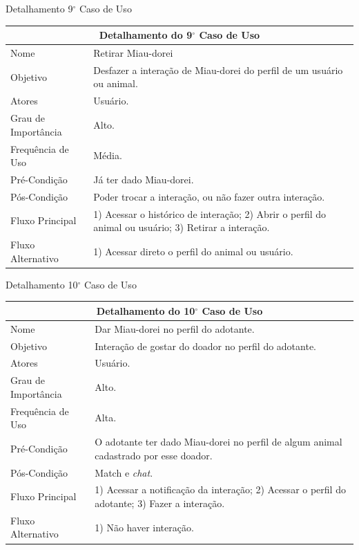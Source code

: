 \begin{apendicesenv}
\begin{quadro}[!htbp]
\caption[Detalhamento 9$^\circ$ Caso de Uso]{Detalhamento 9$^\circ$ Caso de Uso}
\begin{tabular}{|p{4cm}|p{9.95cm}|}
\hline
\multicolumn{2}{|c|}{Detalhamento do 9$^\circ$ Caso de Uso}\\ 
\hline
Nome & Retirar \gls{Miau-dorei} \\
\hline
Objetivo & Desfazer a interação de \gls{Miau-dorei} do perfil de um usuário ou animal. \\
\hline
Atores & Usuário. \\
\hline
Grau de Importância & Alto. \\
\hline
Frequência de Uso & Média. \\
\hline
Pré-Condição & Já ter dado \gls{Miau-dorei}. \\
\hline
Pós-Condição & Poder trocar a interação, ou não fazer outra interação. \\
\hline
Fluxo Principal & 1) Acessar o histórico de interação; 2) Abrir o perfil do animal ou usuário; 3) Retirar a interação. \\
\hline
Fluxo Alternativo & 1) Acessar direto o perfil do animal ou usuário. \\
\hline
\end{tabular}
\end{quadro}

\begin{quadro}[!htbp]
\caption[Detalhamento 10$^\circ$ Caso de Uso]{Detalhamento 10$^\circ$ Caso de Uso}
\begin{tabular}{|p{4cm}|p{9.95cm}|}
\hline
\multicolumn{2}{|c|}{Detalhamento do 10$^\circ$ Caso de Uso}\\ 
\hline
Nome & Dar \gls{Miau-dorei} no perfil do adotante. \\
\hline
Objetivo & Interação de gostar do doador no perfil do adotante.\\
\hline
Atores & Usuário. \\
\hline
Grau de Importância & Alto. \\
\hline
Frequência de Uso & Alta. \\
\hline
Pré-Condição & O adotante ter dado \gls{Miau-dorei} no perfil de algum animal cadastrado por esse doador. \\
\hline
Pós-Condição & \gls{Match} e \textit{chat}. \\
\hline
Fluxo Principal & 1) Acessar a notificação da interação; 2) Acessar o perfil do adotante; 3) Fazer a interação. \\
\hline
Fluxo Alternativo & 1) Não haver interação. \\
\hline
\end{tabular}
\end{quadro}


\end{apendicesenv}
